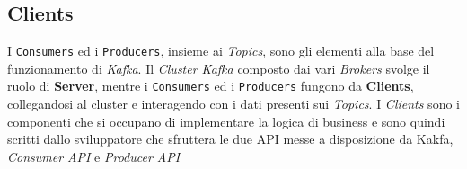 \subsection{Clients}
\label{subsec:kakfa_clients}
I \texttt{Consumers} ed i \texttt{Producers}, insieme ai \textit{Topics}, sono gli elementi alla base del funzionamento di \textit{Kafka}.
Il \textit{Cluster Kafka} composto dai vari \textit{Brokers} svolge il ruolo di \textbf{Server}, mentre i \texttt{Consumers} ed i \texttt{Producers} fungono da \textbf{Clients},
collegandosi al cluster e interagendo con i dati presenti sui \textit{Topics}.
I \textit{Clients} sono i componenti che si occupano di implementare la logica di business e sono quindi scritti dallo sviluppatore che sfruttera le due API messe a disposizione da Kakfa,
\textit{Consumer API} e \textit{Producer API}

